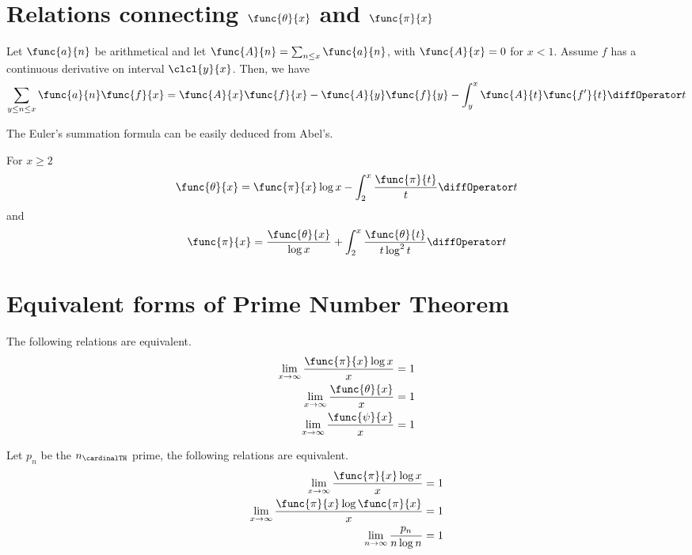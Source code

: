 \section{Relations connecting \(\func{\theta}{x}\) and \(\func{\pi}{x}\)}
\begin{theorem}
    Let \(\func{a}{n}\) be arithmetical and let \(\func{A}{n} = \sum_{n \leq x} \func{a}{n}\), with \(\func{A}{x} = 0\) for \(x < 1\). Assume \(f\) has a continuous derivative on interval \(\clcl{y}{x}\). Then, we have 
    \begin{align*}
        \sum_{y \leq n \leq x} \func{a}{n}\func{f}{x} = \func{A}{x} \func{f}{x} - \func{A}{y} \func{f}{y} - \int_{y}^x \func{A}{t} \func{f'}{t} \diffOperator t
    \end{align*}
\end{theorem}
The Euler's summation formula can be easily deduced from Abel's.

\begin{theorem}
    For \(x \geq 2\)
    \begin{equation*}
        \func{\theta}{x} = \func{\pi}{x} \log x - \int_{2}^x \dfrac{\func{\pi}{t}}{t} \diffOperator t
    \end{equation*}
    and 
    \begin{equation*}
        \func{\pi}{x} = \dfrac{\func{\theta}{x}}{\log x} + \int_2^x \dfrac{\func{\theta}{t}}{t \log ^2 t} \diffOperator t
    \end{equation*}
\end{theorem}

\section{Equivalent forms of Prime Number Theorem}
\begin{theorem}
    The following relations are equivalent.
    \begin{align}
        \lim_{x \to \infty} \dfrac{\func{\pi}{x} \log x}{x} &= 1\\
        \lim_{x \to \infty} \dfrac{\func{\theta}{x}}{x} &= 1\\
        \lim_{x \to \infty} \dfrac{\func{\psi}{x}}{x} &= 1
    \end{align}
\end{theorem}
\begin{theorem}
    Let \(p_n\) be the \(n_{\cardinalTH}\) prime, the following relations are equivalent.
    \begin{align*}
        \lim_{x \to \infty} \dfrac{\func{\pi}{x} \log x}{x} = 1\\
        \lim_{x \to \infty} \dfrac{\func{\pi}{x} \log \func{\pi}{x}}{x} = 1\\
        \lim_{n \to \infty} \dfrac{p_n}{n \log n} = 1
    \end{align*}
\end{theorem}

